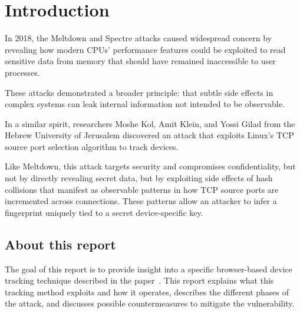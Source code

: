 \documentclass{report}
\begin{document}
\fontsize{8pt}{9pt}\selectfont
{}



\tableofcontents
\thispagestyle{empty}
\clearpage
\pagestyle{plain}

\listoffigures

\clearpage
{}
\pagestyle{default}

\chapter{Introduction}
\label{sec:introduction}

In 2018, the \alert{Meltdown} and \alert{Spectre} attacks caused widespread concern by revealing how modern CPUs’ performance features could be exploited to read sensitive data from memory that should have remained inaccessible to user processes.

These attacks demonstrated a broader principle: that subtle side effects in complex systems can leak internal information not intended to be observable.

In a similar spirit, researchers Moshe Kol, Amit Klein, and Yossi Gilad from the Hebrew University of Jerusalem discovered an attack that exploits Linux’s \alert{TCP source port selection algorithm} to track devices.

Like Meltdown, this attack targets \alert{security} and compromises confidentiality, but not by directly revealing secret data, but by exploiting side effects of \alert{hash collisions} that manifest as observable patterns in how \alert{TCP source ports} are incremented across connections. These patterns allow an attacker to infer a fingerprint uniquely tied to a \alert{secret device-specific key}.

\section{About this report}
\label{sec:goal_of_this_report}

The goal of this report is to provide insight into a specific browser-based device tracking technique described in the paper~\cite{kol2022devicetrackinglinuxsnew}. This report explains what this tracking method exploits and how it operates, describes the different phases of the attack, and discusses possible countermeasures to mitigate the vulnerability.
\end{document}
